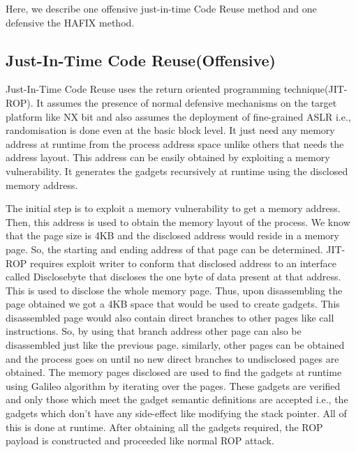 \documentclass{article}
\begin{document}
\begin{multicols}{2}
	Here, we describe one offensive just-in-time Code Reuse \cite{jitrop} method and one defensive the HAFIX \cite{hafix} method.
	
	\subsection{Just-In-Time Code Reuse(Offensive)}
	Just-In-Time Code Reuse uses the return oriented programming technique(JIT-ROP). It assumes the presence of normal defensive mechanisms on the target platform like NX bit and also assumes the deployment of fine-grained ASLR i.e., randomisation is done even at the basic block level. It just need any memory address at runtime from the process address space unlike others that needs the address layout. This address can be easily obtained by exploiting a memory vulnerability. It generates the gadgets recursively at runtime using the disclosed memory address.
	
	The initial step is to exploit a memory vulnerability to get a memory address. Then, this address is used to obtain the memory layout of the process. We know that the page size is 4KB and the disclosed address would reside in a memory page. So, the starting and ending address of that page can be determined. JIT-ROP requires exploit writer to conform that disclosed address to an interface called Disclosebyte that discloses the one byte of data present at that address. This is used to disclose the whole memory page. Thus, upon disassembling the page obtained we got a 4KB space that would be used to create gadgets. This disassembled page would also contain direct branches to other pages like call instructions. So, by using that branch address other page can also be disassembled just like the previous page. similarly, other pages can be obtained and the process goes on until no new direct branches to undisclosed pages are obtained. The memory pages disclosed are used to find the gadgets at runtime using Galileo algorithm by iterating over the pages. These gadgets are verified and only those which meet the gadget semantic definitions are accepted i.e., the gadgets which don't have any side-effect like modifying the stack pointer. All of this is done at runtime. After obtaining all the gadgets required, the ROP payload is constructed and proceeded like normal ROP attack.
	

\end{multicols}
\end{document}
